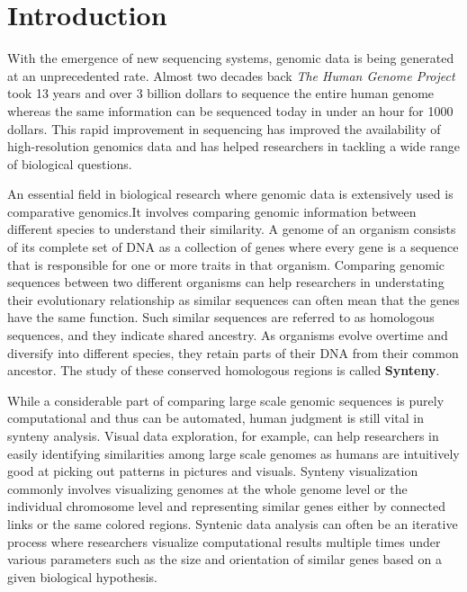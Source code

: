\chapter{Introduction}

With the emergence of new sequencing systems, genomic data is being generated at an unprecedented rate. Almost two decades back \textit{The Human Genome Project} took 13 years and over 3 billion dollars to sequence the entire human genome whereas the same information can be sequenced today in under an hour for 1000 dollars. This rapid improvement in sequencing has improved the availability of high-resolution genomics data and has helped researchers in tackling a wide range of biological questions.




An essential field in biological research where genomic data is extensively used is comparative genomics.It involves comparing genomic information between different species to understand their similarity. A genome of an organism consists of its complete set of DNA as a collection of genes where every gene is a sequence that is responsible for one or more traits in that organism. Comparing genomic sequences between two different organisms can help researchers in understating their evolutionary relationship as similar sequences can often mean that the genes have the same function. Such similar sequences are referred to as homologous sequences, and they indicate shared ancestry. As organisms evolve overtime and diversify into different species, they retain parts of their DNA from their common ancestor. The study of these conserved homologous regions is called \textbf{Synteny}. 

While a considerable part of comparing large scale genomic sequences is purely computational and thus can be automated, human judgment is still vital in synteny analysis. Visual data exploration, for example, can help researchers in easily identifying similarities among large scale genomes as humans are intuitively good at picking out patterns in pictures and visuals. Synteny visualization commonly involves visualizing genomes at the whole genome level or the individual chromosome level and representing similar genes either by connected links or the same colored regions. Syntenic data analysis can often be an iterative process where researchers visualize computational results multiple times under various parameters such as the size and orientation of similar genes based on a given biological hypothesis.

